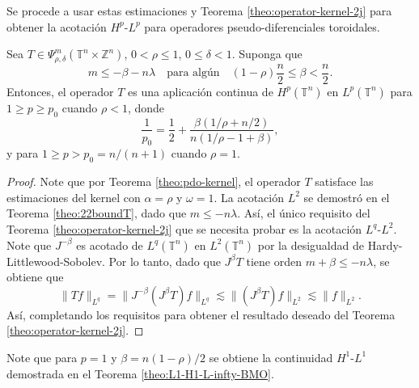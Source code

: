 Se procede a usar estas estimaciones y Teorema \ref{theo:operator-kernel-2j} para obtener la acotación $H^p$-$L^p$ para operadores pseudo-diferenciales toroidales. 
\begin{theorem}
	Sea $T\in \Psi^m_{\rho,\delta}(\mathbb{T}^n\times\mathbb{Z}^n)$, $0<\rho\leq1$, $0\leq\delta<1$. Suponga que 
	\begin{equation*}
		m\leq-\beta-n\lambda \quad  \text{para algún} \quad (1-\rho)\frac{n}{2}\leq\beta< \frac{n}{2}.
	\end{equation*}
	Entonces, el operador $T$ es una aplicación continua de $H^p(\mathbb{T}^n)$ en $L^p(\mathbb{T}^n)$ para $1 \geq p \geq p_0$ cuando $\rho<1$, donde 
	\begin{equation}
		\frac{1}{p_0} = \frac{1}{2} + \frac{\beta(1/\rho + n/2)}{n(1/\rho-1+\beta)},
	\end{equation}
	y para $1\geq p > p_0=n/(n+1)$ cuando $\rho=1$.
	\label{theo:Hp-Lp}
\end{theorem}
\begin{proof}
	Note que por Teorema \ref{theo:pdo-kernel}, el operador $T$ satisface las estimaciones del kernel con $\alpha=\rho$ y $\omega=1$. La acotación $L^2$ se demostró en el Teorema \ref{theo:22boundT}, dado que $m\leq -n\lambda$. Así, el único requisito del Teorema \ref{theo:operator-kernel-2j} que se necesita probar es la acotación $L^q$-$L^2$. Note que $J^{-\beta}$ es acotado de $L^q(\mathbb{T}^n)$ en $L^2(\mathbb{T}^n)$ por la desigualdad de Hardy-Littlewood-Sobolev. Por lo tanto, dado que $J^\beta T$ tiene orden $m+\beta \leq -n\lambda$, se obtiene que 
	\begin{equation}
		\|Tf\|_{L^q} =    \|J^{-\beta}(J^\beta T)f\|_{L^q} \lesssim \|(J^\beta T)f\|_{L^2} \lesssim \|f\|_{L^2}.
		\label{eq:q-2-boundedness}
	\end{equation}
	Así, completando los requisitos para obtener el resultado deseado del Teorema \ref{theo:operator-kernel-2j}.
\end{proof}
\begin{remark}
	Note que para $p=1$ y $\beta=n(1-\rho)/2$ se obtiene la continuidad $H^1$-$L^1$ demostrada en el Teorema \ref{theo:L1-H1-L-infty-BMO}.
	\end{remark}
